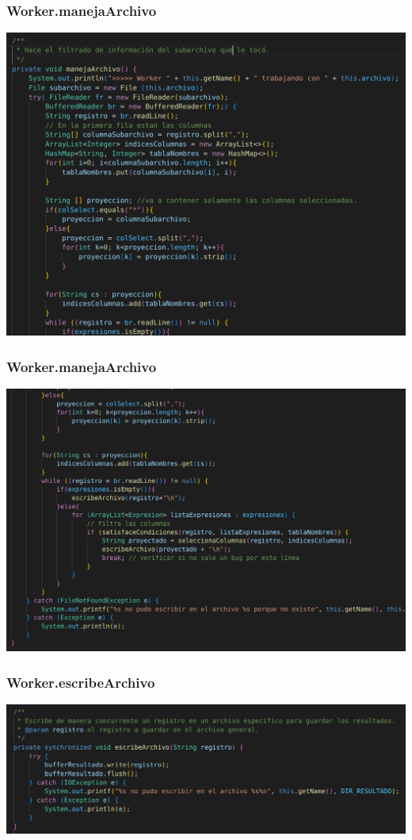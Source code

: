 \documentclass{beamer}
\begin{document}
\begin{frame}
\frametitle{Worker.manejaArchivo}
\includegraphics[width=\linewidth]{worker_manejaarchivo1}
\end{frame}

\begin{frame}
\frametitle{Worker.manejaArchivo}
\includegraphics[width=\linewidth]{worker_manejaarchivo2}
\end{frame}

\begin{frame}
\frametitle{Worker.escribeArchivo}
\includegraphics[width=\linewidth]{worker_escribearchivo}
\end{frame}
\end{document}
